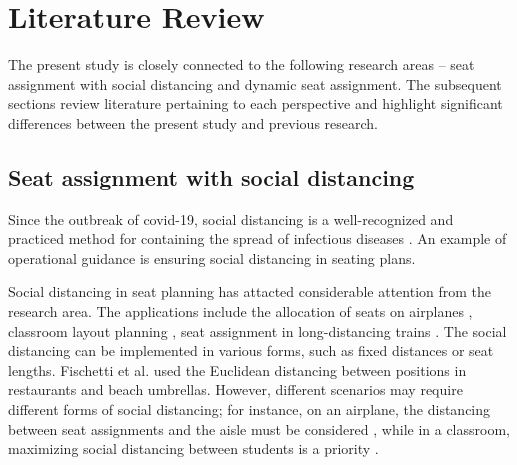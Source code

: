 \section{Literature Review}

The present study is closely connected to the following research areas -- seat assignment with social distancing and dynamic seat assignment. The subsequent sections review literature pertaining to each perspective and highlight significant differences between the present study and previous research.

\subsection{Seat assignment with social distancing}
Since the outbreak of covid-19, social distancing is a well-recognized and practiced method for containing the spread of infectious diseases \cite{moosa2020effectiveness}. An example of operational guidance is ensuring social distancing in seating plans.

Social distancing in seat planning has attacted considerable attention from the research area. The applications include the allocation of seats on airplanes \cite{ghorbani2020model}, classroom layout planning \cite{bortolete2022support}, seat assignment in long-distancing trains \cite{haque2022optimization}. The social distancing can be implemented in various forms, such as fixed distances or seat lengths. Fischetti et al.\cite{fischetti2021safe} used the Euclidean distancing between positions in restaurants and beach umbrellas. However, different scenarios may require different forms of social distancing; for instance, on an airplane, the distancing between seat assignments and the aisle must be considered \cite{salari2022social}, while in a classroom, maximizing social distancing between students is a priority \cite{bortolete2022support}.







